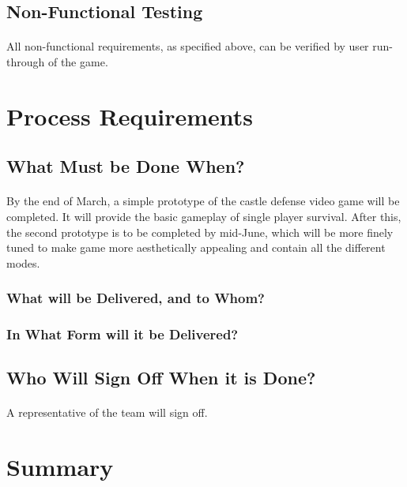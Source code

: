 \subsection{Non-Functional Testing}

\paragraph{} All non-functional requirements, as specified above, can be verified by user run-through of the game.

\section{Process Requirements}

\subsection{What Must be Done When?}

\paragraph{} By the end of March, a simple prototype of the castle defense video game will be completed. It will provide the basic gameplay of single player survival. After this, the second prototype is to be completed by mid­-June, which will be more finely tuned to make game more aesthetically appealing and contain all the different modes.

\subsubsection{What will be Delivered, and to Whom?}

\subsubsection{In What Form will it be Delivered?}

\subsection{Who Will Sign Off When it is Done?}

\paragraph{} A representative of the team will sign off.

\section{Summary}

